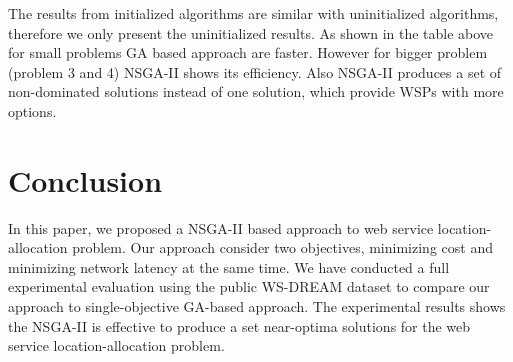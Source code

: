 \documentclass{llncs}
\begin{document}
The results from initialized algorithms are similar with uninitialized algorithms, therefore we only present the uninitialized results.
As shown in the table above for small problems GA based approach are faster. However for bigger problem (problem 3 and 4) NSGA-II shows its efficiency. Also NSGA-II produces a set of 
non-dominated solutions instead of one solution, which provide WSPs with more options.
%



\section{Conclusion}
\label{sec:conclusion}
In this paper, we proposed a NSGA-II based approach to web service location-allocation problem. 
Our approach consider two objectives, minimizing cost  and minimizing network latency at the same time.
We have conducted a full experimental evaluation using the public WS-DREAM dataset to compare our approach to single-objective GA-based approach.
The experimental results shows the NSGA-II is effective to produce a set near-optima solutions for the web service location-allocation problem.




\end{document}
